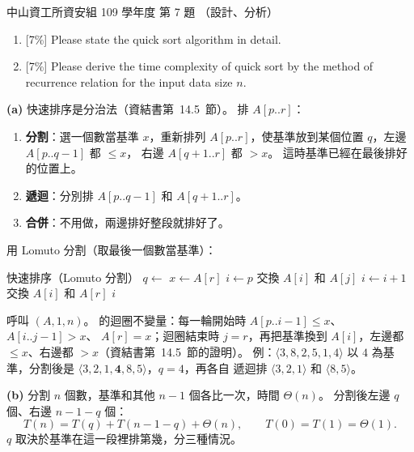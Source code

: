 \begin{pastexam}[label={px:nsysu-109-dmalg-04}]{中山資工所資安組 109 學年度 第 7 題}
（設計、分析）

\begin{enumerate}[label=(\alph*)]
\item {[7\%]} Please state the quick sort algorithm in detail.
\item {[7\%]} Please derive the time complexity of quick sort by the method of recurrence relation
for the input data size $n$.
\end{enumerate}
\end{pastexam}

\begin{pastsoln}
\textbf{(a)} 快速排序是分治法（資結書第~14.5~節）。 排 $A[p..r]$：
\begin{enumerate}
\item \textbf{分割}：選一個數當基準 $x$，重新排列 $A[p..r]$，使基準放到某個位置 $q$，左邊 $A[p..q-1]$ 都 $\le x$，
右邊 $A[q+1..r]$ 都 $> x$。 這時基準已經在最後排好的位置上。
\item \textbf{遞迴}：分別排 $A[p..q-1]$ 和 $A[q+1..r]$。
\item \textbf{合併}：不用做，兩邊排好整段就排好了。
\end{enumerate}
用 Lomuto 分割（取最後一個數當基準）：
\begin{pseudo}{快速排序（Lomuto 分割）}
        \State $q \gets$ 
        \State {}
        \State {}
    \EndIf
\EndProcedure
{}
    \State $x \gets A[r]$ 
    \State $i \gets p$
            \State 交換 $A[i]$ 和 $A[j]$
            \State $i \gets i + 1$
        \EndIf
    \EndFor
    \State 交換 $A[i]$ 和 $A[r]$
    \State \Return $i$
\EndFunction
\end{pseudo}
呼叫 $(A, 1, n)$。  的迴圈不變量：每一輪開始時 $A[p..i-1] \le x$、$A[i..j-1] > x$、
$A[r] = x$；迴圈結束時 $j = r$，再把基準換到 $A[i]$，左邊都 $\le x$、右邊都 $> x$（資結書第~14.5~節的證明）。
例：$\langle 3, 8, 2, 5, 1, 4\rangle$ 以 $4$ 為基準，分割後是 $\langle 3, 2, 1, \mathbf{4}, 8, 5\rangle$，$q = 4$，再各自
遞迴排 $\langle 3, 2, 1\rangle$ 和 $\langle 8, 5\rangle$。

\textbf{(b)} 分割 $n$ 個數，基準和其他 $n - 1$ 個各比一次，時間 $\Theta(n)$。 分割後左邊 $q$ 個、右邊 $n - 1 - q$ 個：
\[
T(n) = T(q) + T(n - 1 - q) + \Theta(n), \qquad T(0) = T(1) = \Theta(1).
\]
$q$ 取決於基準在這一段裡排第幾，分三種情況。


\end{pastsoln}

